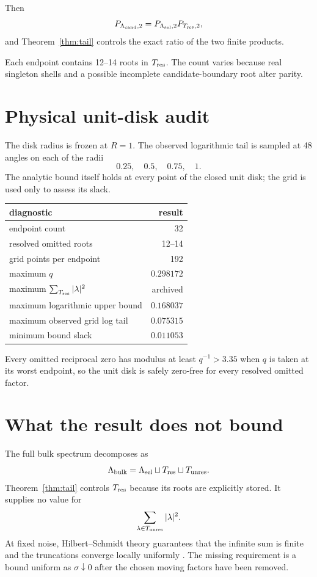 \documentclass[11pt]{article}
\theoremstyle{remark}\newtheorem{remark}[theorem]{Remark}
\begin{document}
Then
\begin{equation}\label{eq:split}
 P_{\Lambda_{\rm cand},2}
 =P_{\Lambda_{\rm sel},2}P_{T_{\rm res},2},
\end{equation}
and Theorem~\ref{thm:tail} controls the exact ratio of the two finite products.

Each endpoint contains 12--14 roots in $T_{\rm res}$. The count varies because
real singleton shells and a possible incomplete candidate-boundary root alter
parity.

\section{Physical unit-disk audit}

The disk radius is frozen at $R=1$. The observed logarithmic tail is sampled
at 48 angles on each of the radii
\[
 0.25,\quad0.5,\quad0.75,\quad1.
\]
The analytic bound itself holds at every point of the closed unit disk; the
grid is used only to assess its slack.

\begin{center}
\begin{tabular}{lr}
\toprule
diagnostic & result\\
\midrule
endpoint count & 32\\
resolved omitted roots & 12--14\\
grid points per endpoint & 192\\
maximum $q$ & $0.298172$\\
maximum $\sum_{T_{\rm res}}|\lambda|^2$ & archived\\
maximum logarithmic upper bound & $0.168037$\\
maximum observed grid log tail & $0.075315$\\
minimum bound slack & $0.011053$\\
\bottomrule
\end{tabular}
\end{center}

Every omitted reciprocal zero has modulus at least $q^{-1}>3.35$ when $q$ is
taken at its worst endpoint, so the unit disk is safely zero-free for every
resolved omitted factor.

\section{What the result does not bound}

The full bulk spectrum decomposes as
\[
 \Lambda_{\rm bulk}
 =\Lambda_{\rm sel}\sqcup T_{\rm res}\sqcup T_{\rm unres}.
\]
Theorem~\ref{thm:tail} controls $T_{\rm res}$ because its roots are explicitly
stored. It supplies no value for
\[
 \sum_{\lambda\in T_{\rm unres}}|\lambda|^2.
\]
At fixed noise, Hilbert--Schmidt theory guarantees that the infinite sum is
finite and the truncations converge locally uniformly
\citep{WangRH7,Simon2005}. The missing requirement is a bound uniform as
$\sigma\downarrow0$ after the chosen moving factors have been removed.
\end{document}
